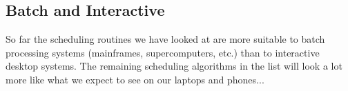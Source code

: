 \subsection*{Batch and Interactive}

So far the scheduling routines we have looked at are more suitable to batch processing systems (mainframes, supercomputers, etc.) than to interactive desktop systems. The remaining scheduling algorithms in the list will look a lot more like what we expect to see on our laptops and phones...



